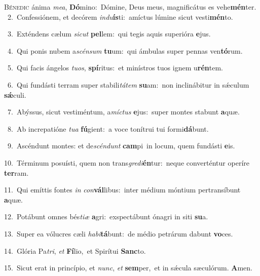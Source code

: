 \lettrine{\initial\textcolor{\initialcolor}{B}}{énedic} ánima \textit{me}\-\textit{a}, \textbf{Dó}\-mino:~\star Dómine, Deus meus, magnificátus es vehe\-\textbf{mén}\-ter.\\
{\numbfont\textcolor{\numbcolor}{~2.}}~Confessiónem, et decórem \textit{ind}\-\textit{u}\textbf{ís}ti:~\star amíctus lúmine sicut vesti\-\textbf{mén}\-to.\par
{\numbfont\textcolor{\numbcolor}{~3.}}~Exténdens cælum \textit{sic}\-\textit{ut} \textbf{pel}\-lem:~\star qui tegis aquis superióra \textbf{e}\-jus.\par
{\numbfont\textcolor{\numbcolor}{~4.}}~Qui ponis nubem a\-\textit{scén}\-\textit{sum} \textbf{tu}\-um:~\star qui ámbulas super pennas ven\-\textbf{tó}\-rum.\par
{\numbfont\textcolor{\numbcolor}{~5.}}~Qui facis ángelos \textit{tu}\-\textit{os}, \textbf{spí}\-ritus:~\star et minístros tuos ignem u\-\textbf{rén}\-tem.\par
{\numbfont\textcolor{\numbcolor}{~6.}}~Qui fundásti terram super stabili\-\textit{tá}\-\textit{tem} \textbf{su}\-am:~\star non inclinábitur in sǽculum \textbf{sǽ}\-culi.\par
{\numbfont\textcolor{\numbcolor}{~7.}}~Abýssus, sicut vestiméntum, a\-\textit{míc}\-\textit{tus} \textbf{e}\-jus:~\star super montes stabunt \textbf{a}\-quæ.\par
{\numbfont\textcolor{\numbcolor}{~8.}}~Ab increpatióne \textit{tu}\-\textit{a} \textbf{fú}\-gient:~\star a voce tonítrui tui formi\-\textbf{dá}\-bunt.\par
{\numbfont\textcolor{\numbcolor}{~9.}}~Ascéndunt montes: et de\-\textit{scén}\-\textit{dunt} \textbf{cam}\-pi~\star in locum, quem fundásti \textbf{e}\-is.\par
{\numbfont\textcolor{\numbcolor}{10.}}~Términum posuísti, quem non trans\-\textit{gre}\-\textit{di}\textbf{én}tur:~\star neque converténtur operíre \textbf{ter}\-ram.\par
{\numbfont\textcolor{\numbcolor}{11.}}~Qui emíttis fontes \textit{in} \textit{con}\-\textbf{vál}libus:~\star inter médium móntium pertransíbunt \textbf{a}\-quæ.\par
{\numbfont\textcolor{\numbcolor}{12.}}~Potábunt omnes bés\-\textit{ti}\-\textit{æ} \textbf{a}\-gri:~\star exspectábunt ónagri in siti \textbf{su}\-a.\par
{\numbfont\textcolor{\numbcolor}{13.}}~Super ea vólucres cæli \textit{ha}\-\textit{bi}\textbf{tá}bunt:~\star de médio petrárum dabunt \textbf{vo}\-ces.\par
{\numbfont\textcolor{\numbcolor}{14.}}~Glória Pa\-\textit{tri}\-, \textit{et} \textbf{Fí}\-lio,~\star et Spirítui \textbf{Sanc}\-to.\par
{\numbfont\textcolor{\numbcolor}{15.}}~Sicut erat in princípio, et \textit{nunc}\-, \textit{et} \textbf{sem}\-per,~\star et in sǽcula sæculórum. \textbf{A}\-men.\par
